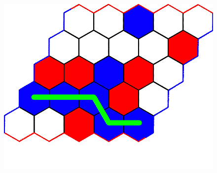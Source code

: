 \documentclass[a4paper]{article}
\begin{document}
\begin{figure}[t]
\begin{center}
\begin{minipage}[t]{.35\linewidth}
    \includegraphics[width=\linewidth]{figures/example_game/ex_game_tf.png}
    \end{minipage}
    \end{center}
    \label{fig:example_game}
\end{figure}
\end{document}
